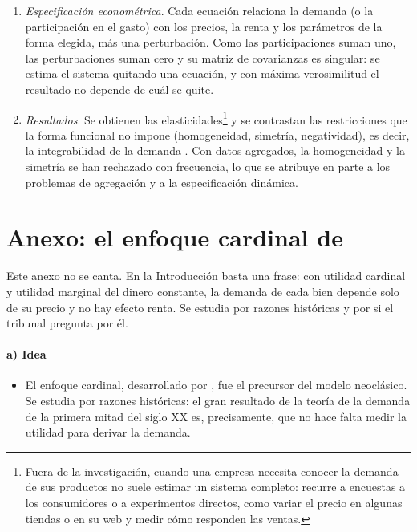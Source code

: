 \documentclass[11pt]{article}
\begin{document}
\begin{enumerate}
\item \emph{Especificación econométrica}. Cada ecuación relaciona la demanda (o la participación en el gasto) con los precios, la renta y los parámetros de la forma elegida, más una perturbación. Como las participaciones suman uno, las perturbaciones suman cero y su matriz de covarianzas es singular: se estima el sistema quitando una ecuación, y con máxima verosimilitud el resultado no depende de cuál se quite\nocite{Barten1969Maximum}.
\item \emph{Resultados}. Se obtienen las elasticidades\footnote{Fuera de la investigación, cuando una empresa necesita conocer la demanda de sus productos no suele estimar un sistema completo: recurre a encuestas a los consumidores o a experimentos directos, como variar el precio en algunas tiendas o en su web y medir cómo responden las ventas.} y se contrastan las restricciones que la forma funcional no impone (homogeneidad, simetría, negatividad), es decir, la integrabilidad de la demanda . Con datos agregados, la homogeneidad y la simetría se han rechazado con frecuencia, lo que se atribuye en parte a los problemas de agregación y a la especificación dinámica\nocite{Barten1967Slutsky,DeatonMuellbauer1980AIDS}.
\end{enumerate}

\section{Anexo: el enfoque cardinal de }\label{anexo:cardinal}

\begin{notaopositor}
Este anexo no se canta. En la Introducción basta una frase: con utilidad cardinal y utilidad marginal del dinero constante, la demanda de cada bien depende solo de su precio y no hay efecto renta. Se estudia por razones históricas y por si el tribunal pregunta por él.
\end{notaopositor}

\paragraph{a) Idea}

\begin{itemize}
\item El enfoque cardinal, desarrollado por \textcite{Marshall1890Principles}, fue el precursor del modelo neoclásico. Se estudia por razones históricas: el gran resultado de la teoría de la demanda de la primera mitad del siglo XX es, precisamente, que no hace falta medir la utilidad para derivar la demanda.
\end{itemize}
\end{document}
